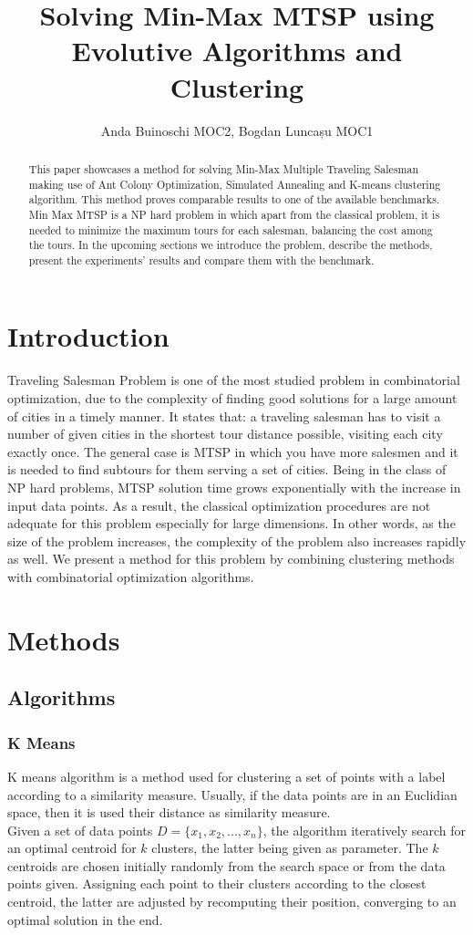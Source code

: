 \documentclass{article}
\title{Solving Min-Max MTSP using Evolutive Algorithms and Clustering}
\author{Anda Buinoschi MOC2, Bogdan Luncașu MOC1 }
\date{}
\begin{document}
\maketitle

\begin{abstract}
This paper showcases a method for solving Min-Max Multiple Traveling Salesman making use of Ant Colony Optimization, Simulated Annealing and K-means clustering algorithm. This method proves comparable results to one of the available benchmarks. Min Max MTSP is a NP hard problem in which apart from the classical problem, it is needed to minimize the maximum tours for each salesman, balancing the cost among the tours. In the upcoming sections we introduce the problem, describe the methods, present the experiments' results and compare them with the benchmark.
\end{abstract}

\section{Introduction}
Traveling Salesman Problem is one of the most studied problem in combinatorial optimization, due to the complexity of finding good solutions for a large amount of cities in a timely manner. It states that: a traveling salesman has to visit a number of given cities in the shortest tour distance possible, visiting each city exactly once. The general case is MTSP in which you have more salesmen and it is needed to find subtours for them serving a set of cities. Being in the class of NP hard problems, MTSP solution time grows exponentially with the increase in input data points. As a result, the classical optimization procedures are not adequate for this problem especially for large dimensions. In other words, as the size of the problem increases, the complexity of the problem also increases rapidly as well. We present a method for this problem by combining clustering methods with combinatorial optimization algorithms.

\section{Methods}
\subsection{Algorithms}
\subsubsection{K Means}
K means algorithm is a method used for clustering a set of points with a label according to a similarity measure. Usually, if the data points are in an Euclidian space, then it is used their distance as similarity measure.\\
Given a set of data points $D=\{x_1, x_2,...,x_n\}$, the algorithm iteratively search for an optimal centroid for $k$ clusters, the latter being given as parameter. The $k$ centroids are chosen initially randomly from the search space or from the data points given. Assigning each point to their clusters according to the closest centroid, the latter are adjusted by recomputing their position, converging to an optimal solution in the end.
\end{document}
